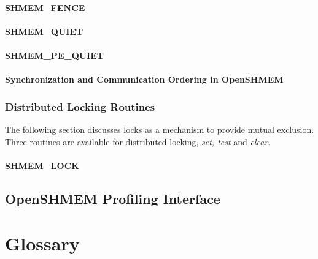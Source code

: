 \documentclass[10pt,oneside]{book}
\begin{document}
\subsubsection{\textbf{SHMEM\_FENCE}}\label{subsec:shmem_fence}


\subsubsection{\textbf{SHMEM\_QUIET}}\label{subsec:shmem_quiet}


\subsubsection{\textbf{SHMEM\_PE\_QUIET}}\label{subsec:shmem_pe_quiet}


\subsubsection{Synchronization and Communication Ordering in OpenSHMEM}







\subsection{Distributed Locking Routines}
The following section discusses \openshmem locks as a mechanism to provide
mutual exclusion. Three routines are available for distributed locking,
\textit{set, test} and \textit{clear}.

\subsubsection{\textbf{SHMEM\_LOCK}}\label{subsec:shmem_lock}






\section{OpenSHMEM Profiling Interface}\label{sec:openshmem_profiling_interface}


\clearpage


\chapter*{Glossary}


\clearpage
{}
{}
\printindex
\end{document}
